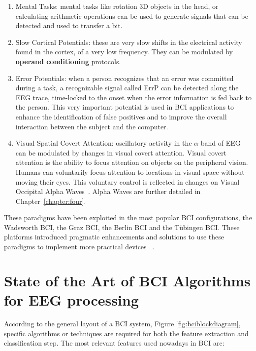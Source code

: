 \begin{enumerate}
\item Mental Tasks: mental tasks like rotation 3D objects in the head, or calculating arithmetic operations can be used to generate signals that can be detected and used to transfer a bit.
\item Slow Cortical Potentials: these are very slow shifts in the electrical activity found in the cortex, of a very low frequency.  They can be modulated by \textbf{operand conditioning} protocols.
\item Error Potentials: when a person recognizes that an error was committed during a task, a recognizable signal called ErrP can be detected along the EEG trace, time-locked to the onset when the error information is fed back to the person.  This very important potential is used in BCI applications to enhance the identification of false positives and to improve the overall interaction between the subject and the computer.
\item Visual Spatial Covert Attention: oscillatory activity in the $\alpha$ band of EEG can be modulated by changes in visual covert attention.  Visual covert attention is the ability to focus attention on objects on the peripheral vision.  Humans can voluntarily focus attention to locations in visual space without moving their eyes.  This voluntary control is reflected in changes on Visual Occipital Alpha Waves~\cite{c62}.  Alpha Waves are further detailed in Chapter~\ref{chapter:four}.
\end{enumerate}

These paradigms have been exploited in the most popular BCI configurations, the Wadsworth BCI, the Graz BCI, the Berlin BCI and the Tübingen BCI.  These platforms introduced pragmatic enhancements and solutions to use these paradigms to implement more practical devices~\cite{Nam2018} \cite{Schomer2010}.



\section{State of the Art of BCI Algorithms for EEG processing}

According to the general layout of a BCI system, Figure \ref{fig:bciblockdiagram}, specific algorithms or techniques are required for both the feature extraction and classification step.  The most relevant features used nowadays in BCI are:

